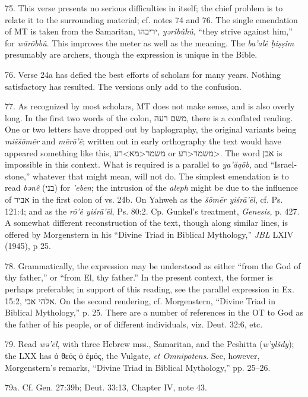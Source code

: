 \begin{enumerate}
75. This verse presents no serious difficulties in itself; the chief problem
is to relate it to the surrounding material; cf. notes 74 and 76. The single
emendation of MT is taken from the Samaritan, יריבהו, \emph{yərîbûhû},
``they strive against him,'' for \emph{wārōbbû}. This improves the meter as
well as the meaning. The \emph{ba'alê ḥiṣṣîm} presumably are archers, though
the expression is unique in the Bible.

76. Verse 24a has defied the best efforts of scholars for many years. Nothing
satisfactory has resulted. The versions only add to the confusion.

77. As recognized by most scholars, MT does not make sense, and is also overly
long. In the first two words of the colon, משם רעה, there is a conflated
reading. One or two letters have dropped out by haplography, the original
variants being \emph{miššōmēr} and \emph{mērō'ê}; written out in early
orthography the text would have appeared something like this,
משמר<מא>רע or משמר<רע>. The word אבן is impossible in this context. What is
required is a parallel to \emph{ya'ăqōb}, and ``Israel-stone,'' whatever that
might mean, will not do. The simplest emendation is to read \emph{bənê} (בני)
for \emph{'eben}; the intrusion of the \emph{aleph} might be due to the
influence of אביר in the first colon of vs. 24b. On Yahweh as the
\emph{šōmēr yiśrā'ēl}, cf. Ps. 121:4; and as the \emph{rō'ê yiśrā'ēl},
Ps. 80:2. Cp. Gunkel's treatment, \emph{Genesis}, p. 427. A somewhat different
reconstruction of the text, though along similar lines, is offered by
Morgenstern in his ``Divine Triad in Biblical Mythology,'' \emph{JBL} LXIV
(1945), p 25.

78. Grammatically, the expression may be understood as either ``from the God of
thy father,'' or ``from El, thy father.'' In the present context, the former is
perhaps preferable; in support of this reading, see the parallel expression in
Ex. 15:2, אלהי אבי. On the second rendering, cf. Morgenstern, ``Divine Triad in
Biblical Mythology,'' p. 25. There are a number of references in the OT to God
as the father of his people, or of different individuals, viz. Deut. 32:6, etc.

79. Read \emph{wə'ēl}, with three Hebrew mss., Samaritan, and the Peshitta
(\emph{w'ylšdy}); the LXX has ὁ θεός ὁ ἐμός, the Vulgate, \emph{et Omnipotens}.
See, however, Morgenstern's remarks, ``Divine Triad in Biblical Mythology,''
pp. 25--26.

79a. Cf. Gen. 27:39b; Deut. 33:13, Chapter IV, note 43.


\end{enumerate}
